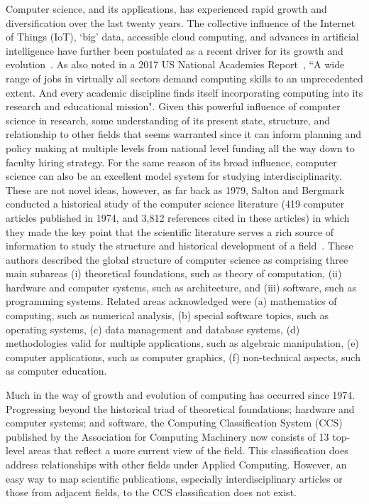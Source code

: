 Computer science, and its applications, has experienced rapid growth and diversification over the last twenty years. The collective influence of the Internet of Things (IoT), `big' data, accessible cloud computing, and advances in artificial intelligence have further been postulated as a recent driver for its growth and evolution~\cite{siebel2019_digital}. As also noted in a 2017 US National Academies Report~\cite{nas_2017}, ``A wide range of jobs in virtually all sectors demand computing skills to an unprecedented extent. And every academic discipline finds itself incorporating computing into its research and educational mission". Given this powerful influence of computer science in research, some understanding of its present state, structure, and relationship to other fields that seems warranted since it can inform planning and policy making at multiple levels from national level funding all the way down to faculty hiring strategy. For the same reason of its broad influence, computer science can also be an excellent model system for studying interdisciplinarity. These are not novel ideas, however, as far back as 1979, Salton and Bergmark conducted a historical study of the computer science literature (419 computer articles published in 1974,  and 3,812 references cited in these articles) in which they made the key point that the scientific literature serves a rich source of information to study the structure and historical development of a field~\cite{salton_citation_1979}. These authors described the global structure of computer science as comprising three main subareas (i) theoretical foundations, such as theory of computation, (ii) hardware and computer systems, such as architecture,  and (iii) software, such as programming systems.  Related areas acknowledged were  (a) mathematics of computing, such as numerical analysis, (b) special software topics, such as operating systems, (c) data management and database systems, (d) methodologies valid for multiple applications, such as algebraic manipulation, (e) computer applications, such as computer graphics, (f) non-technical aspects, such as computer education. 

Much in the way of growth and evolution of computing has occurred since 1974. Progressing beyond the historical triad of theoretical foundations; hardware and computer systems; and software, the Computing Classification System (CCS)~\cite{acm_ref} published by the Association for Computing Machinery now consists of 13 top-level areas that reflect a more current view of the field. This classification does address relationships with other fields under Applied Computing. However, an easy way to map scientific publications, especially interdisciplinary articles or those from adjacent fields, to the CCS classification does not exist. 

